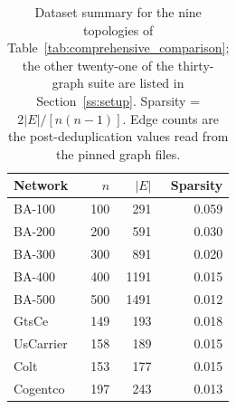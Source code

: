 \begin{table}[htbp]
\centering
\small
\caption{Dataset summary for the nine topologies of Table~\ref{tab:comprehensive_comparison}; the other twenty-one of the thirty-graph suite are listed in Section~\ref{ss:setup}. Sparsity = $2|E|/[n(n-1)]$. Edge counts are the post-deduplication values read from the pinned graph files.}
\label{tab:datasets}
\begin{tabular}{@{}lrrr@{}}
\toprule
\textbf{Network} & \textbf{$n$} & \textbf{$|E|$} & \textbf{Sparsity} \\
\midrule
BA-100 & 100 & 291 & 0.059 \\
BA-200 & 200 & 591 & 0.030 \\
BA-300 & 300 & 891 & 0.020 \\
BA-400 & 400 & 1191 & 0.015 \\
BA-500 & 500 & 1491 & 0.012 \\
GtsCe & 149 & 193 & 0.018 \\
UsCarrier & 158 & 189 & 0.015 \\
Colt & 153 & 177 & 0.015 \\
Cogentco & 197 & 243 & 0.013 \\
\bottomrule
\end{tabular}
\end{table}
